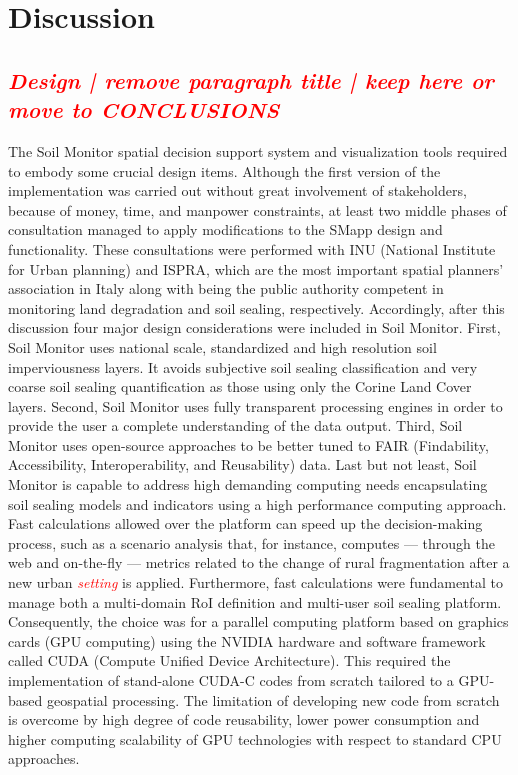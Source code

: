 \documentclass[APA,LATO1COL,doublespace]{WileyNJD-v2}
\newcommand{\toberevised}[1]{\emph{\textcolor{red}{#1}}} %
\begin{document}
\section{Discussion}

\subsection{ \toberevised{Design | remove paragraph title | keep here or move to CONCLUSIONS} }
The Soil Monitor spatial decision support system and visualization tools required to embody some crucial design items. 
Although the first version of the implementation was carried out without great involvement of stakeholders, because of money, time, and manpower constraints, at least two middle phases of consultation managed to apply modifications to the SMapp design and functionality. 
These consultations were performed with INU (National Institute for Urban planning) and ISPRA, which are the most important spatial planners' association in Italy along with being the public authority competent in monitoring land degradation and soil sealing, respectively.
Accordingly, after this discussion four major design considerations were included in Soil Monitor.
First, Soil Monitor uses national scale, standardized and high resolution soil imperviousness layers.
It avoids subjective soil sealing classification and very coarse soil sealing quantification as those using only the Corine Land Cover layers.
Second, Soil Monitor uses fully transparent processing engines in order to provide the user a complete understanding of the data output.
Third, Soil Monitor uses open-source approaches to be better tuned to FAIR (Findability, Accessibility, Interoperability, and Reusability) data.
Last but not least, Soil Monitor is capable to address high demanding computing needs encapsulating soil sealing models and indicators using a high performance computing approach.
Fast calculations allowed over the platform can speed up the decision-making process, such as a scenario analysis that, for instance, computes --- through the web and on-the-fly --- metrics related to the change of rural fragmentation after a new urban \toberevised{setting} is applied.
Furthermore, fast calculations were fundamental to manage both a multi-domain RoI definition and multi-user soil sealing platform.
Consequently, the choice was for a parallel computing platform based on graphics cards (GPU computing) using the NVIDIA hardware and software framework called CUDA (Compute Unified Device Architecture).
This required the implementation of stand-alone CUDA-C codes from scratch tailored to a GPU-based geospatial processing.
The limitation of developing new code from scratch is overcome by high degree of code reusability, lower power consumption and higher computing scalability of GPU technologies with respect to standard CPU approaches.
\end{document}
